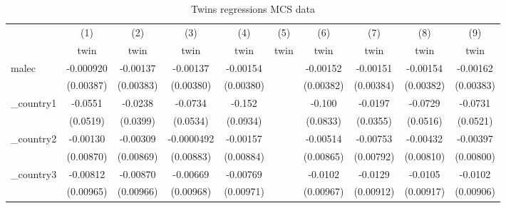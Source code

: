 \begin{table}[htbp]\centering
\def\sym#1{\ifmmode^{#1}\else\(^{#1}\)\fi}
\caption{Twins regressions MCS data}
\begin{tabular}{l*{9}{c}}
\hline\hline
            &\multicolumn{1}{c}{(1)}&\multicolumn{1}{c}{(2)}&\multicolumn{1}{c}{(3)}&\multicolumn{1}{c}{(4)}&\multicolumn{1}{c}{(5)}&\multicolumn{1}{c}{(6)}&\multicolumn{1}{c}{(7)}&\multicolumn{1}{c}{(8)}&\multicolumn{1}{c}{(9)}\\
            &\multicolumn{1}{c}{twin}&\multicolumn{1}{c}{twin}&\multicolumn{1}{c}{twin}&\multicolumn{1}{c}{twin}&\multicolumn{1}{c}{twin}&\multicolumn{1}{c}{twin}&\multicolumn{1}{c}{twin}&\multicolumn{1}{c}{twin}&\multicolumn{1}{c}{twin}\\
\hline
malec       &   -0.000920         &    -0.00137         &    -0.00137         &    -0.00154         &                     &    -0.00152         &    -0.00151         &    -0.00154         &    -0.00162         \\
            &   (0.00387)         &   (0.00383)         &   (0.00380)         &   (0.00380)         &                     &   (0.00382)         &   (0.00384)         &   (0.00382)         &   (0.00383)         \\
[1em]
\_country1   &     -0.0551         &     -0.0238         &     -0.0734         &      -0.152         &                     &      -0.100         &     -0.0197         &     -0.0729         &     -0.0731         \\
            &    (0.0519)         &    (0.0399)         &    (0.0534)         &    (0.0934)         &                     &    (0.0833)         &    (0.0355)         &    (0.0516)         &    (0.0521)         \\
[1em]
\_country2   &    -0.00130         &    -0.00309         &  -0.0000492         &    -0.00157         &                     &    -0.00514         &    -0.00753         &    -0.00432         &    -0.00397         \\
            &   (0.00870)         &   (0.00869)         &   (0.00883)         &   (0.00884)         &                     &   (0.00865)         &   (0.00792)         &   (0.00810)         &   (0.00800)         \\
[1em]
\_country3   &    -0.00812         &    -0.00870         &    -0.00669         &    -0.00769         &                     &     -0.0102         &     -0.0129         &     -0.0105         &     -0.0102         \\
            &   (0.00965)         &   (0.00966)         &   (0.00968)         &   (0.00971)         &                     &   (0.00967)         &   (0.00912)         &   (0.00917)         &   (0.00906)         \\

\end{tabular}
\end{table}

